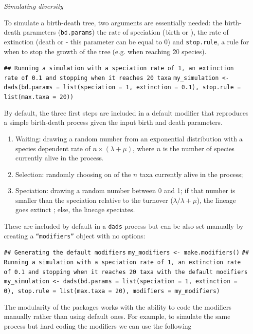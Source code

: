 \documentclass[12pt,letterpaper]{article}
\renewcommand{\subsection}[1]{%
\bigskip
\begin{center}
\begin{large}
\normalfont\itshape #1
\end{large}
\end{center}}
\begin{document}
\subsection{Simulating diversity}

To simulate a birth-death tree, two arguments are essentially needed: the birth-death parameters (\texttt{bd.params}) the rate of speciation (birth or \lambda), the rate of extinction (death or \mu - this parameter can be equal to 0) and \texttt{stop.rule}, a rule for when to stop the growth of the tree (e.g. when reaching 20 species).

\texttt{## Running a simulation with a speciation rate of 1, an extinction rate of 0.1 and stopping when it reaches 20 taxa}
\texttt{my_simulation <- dads(bd.params = list(speciation = 1, extinction = 0.1), stop.rule = list(max.taxa = 20))}

By default, the three first steps are included in a default modifier that reproduces a simple birth-death process given the input birth and death parameters.

\begin{enumerate}
    \item Waiting: drawing a random number from an exponential distribution with a species dependent rate of $n \times (\lambda + \mu)$, where $n$ is the number of species currently alive in the process.
    \item Selection: randomly choosing on of the $n$ taxa currently alive in the process;
    \item Speciation: drawing a random number between 0 and 1; if that number is smaller than the speciation relative to the turnover ($\lambda / \lambda+\mu$), the lineage goes extinct %
    ; else, the lineage speciates.
\end{enumerate}

These are included by default in a \texttt{dads} process but can be also set manually by creating a \texttt{``modifiers''} object with no options:

\texttt{## Generating the default modifiers}
\texttt{my_modifiers <- make.modifiers()}
\texttt{## Running a simulation with a speciation rate of 1, an extinction rate of 0.1 and stopping when it reaches 20 taxa with the default modifiers}
\texttt{my_simulation <- dads(bd.params = list(speciation = 1, extinction = 0), stop.rule = list(max.taxa = 20), modifiers = my_modifiers)}

The modularity of the packages works with the ability to code the modifiers manually rather than using default ones.
For example, to simulate the same process but hard coding the modifiers we can use the following
\end{document}
